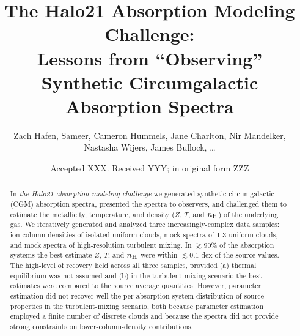 \documentclass[fleqn,usenatbib]{mnras}
\title[``Observing'' Synthetic Circumgalactic Absorption Spectra]{The Halo21 Absorption Modeling Challenge:\\Lessons from ``Observing'' Synthetic Circumgalactic Absorption Spectra}
\author[]{
Zach Hafen,
Sameer,
Cameron Hummels,
Jane Charlton,
Nir Mandelker,
Nastasha Wijers,
James Bullock,
\ldots
\\
}
\date{Accepted XXX. Received YYY; in original form ZZZ}
\begin{document}
\label{firstpage}
\pagerange{\pageref{firstpage}--\pageref{lastpage}}
\maketitle

\begin{abstract}
In \textit{the Halo21 absorption modeling challenge} we generated synthetic circumgalactic (CGM) absorption spectra, presented the spectra to observers, and challenged them to estimate the metallicity, temperature, and density ($Z$, $T$, and $n_{\rm H}$) of the underlying gas.
We iteratively generated and analyzed three increasingly-complex data samples:
ion column densities of isolated uniform clouds,
mock spectra of 1-3 uniform clouds,
and mock spectra of high-resolution turbulent mixing.
In $\gtrsim 90\%$ of the absorption systems the best-estimate $Z$, $T$, and $n_{\rm H}$ were within $\lesssim0.1$ dex of the source values.
The high-level of recovery held across all three samples, provided
(a) thermal equilibrium was not assumed and
(b) in the turbulent-mixing scenario the best estimates were compared to the source average quantities.
However, parameter estimation did not recover well the per-absorption-system distribution of source properties in the turbulent-mixing scenario,
both because parameter estimation employed a finite number of discrete clouds
and because the spectra did not provide strong constraints on lower-column-density contributions.
\end{abstract}
\end{document}
